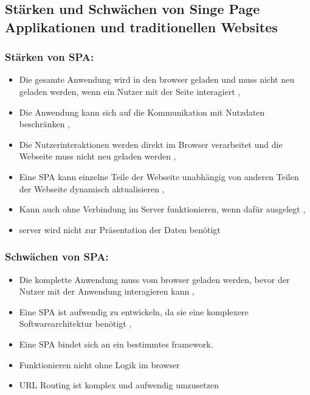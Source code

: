 \subsection{Stärken und Schwächen von Singe Page Applikationen und traditionellen Websites}

\subsubsection*{Stärken von \ac{SPA}:}
\begin{itemize}
  \item Die gesamte Anwendung wird in den \gls{browser} geladen und muss nicht neu geladen werden, wenn ein Nutzer mit der Seite interagiert \cite{Smith2022}, \cite{Flanagan2011}
  \item Die Anwendung kann sich auf die Kommunikation mit Nutzdaten beschränken \cite{Smith2022}, \cite{Flanagan2011}
  \item Die Nutzerinteraktionen werden direkt im Browser verarbeitet und die Webseite muss nicht neu geladen werden \cite{Smith2022}, \cite{Flanagan2011}
  \item Eine \ac{SPA} kann einzelne Teile der Webseite unabhängig von anderen Teilen der Webseite dynamisch aktualisieren \cite{Smith2022}, \cite{Irudayaraj2019}
  \item Kann auch ohne Verbindung im Server funktionieren, wenn dafür ausgelegt \cite{Smith2022}, \cite{Gavrila2019}
  \item \gls{server} wird nicht zur Präsentation der Daten benötigt \cite{Flanagan2011}
\end{itemize}


\subsubsection*{Schwächen von \ac{SPA}:}

\begin{itemize}
  \item Die komplette Anwendung muss vom \gls{browser} geladen werden, bevor der Nutzer mit der Anwendung interagieren kann \cite{Smith2022}, \cite{Gavrila2019}
  \item Eine \ac{SPA} ist aufwendig zu entwickeln, da sie eine komplexere Softwarearchitektur benötigt \cite{Smith2022}, \cite{Flanagan2011}
  \item Eine \ac{SPA} bindet sich an ein bestimmtes \gls{framework}. \cite{Smith2022}
  \item Funktionieren nicht ohne Logik im \gls{browser} \cite{Smith2022}
  \item \ac{URL} Routing ist komplex und aufwendig umzusetzen \cite{Smith2022}
\end{itemize}

